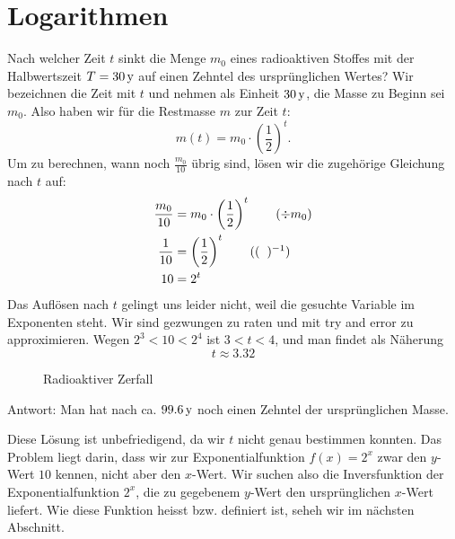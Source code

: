 \documentclass[%
11pt,%
twoside,%
titlepage,%
german,%
headsepline%
]{scrartcl}
\begin{document}
\section{Logarithmen}
\begin{bsp}
Nach welcher Zeit $t$ sinkt die Menge $m_0$ eines radioaktiven Stoffes mit der Halbwertszeit $T=\unit[30]{y}$ auf einen Zehntel des ursprünglichen Wertes? Wir bezeichnen die Zeit mit $t$ und nehmen als Einheit $\unit[30]{y}$, die Masse zu Beginn sei $m_0$. Also haben wir für die Restmasse $m$ zur Zeit $t$:
$$m(t)=m_0\cdot\left(\frac{1}{2}\right)^t.$$
Um zu berechnen, wann noch $\frac{m_0}{10}$ übrig sind, lösen wir die zugehörige Gleichung nach $t$ auf:
    \begin{align*}
    \frac{m_0}{10}&=m_0\cdot\left(\frac{1}{2}\right)^t\tag{$\div m_0$}\\
    \frac{1}{10}&=\left(\frac{1}{2}\right)^t\tag{$(\phantom{x})^{-1}$}\\
    10&=2^t
    \end{align*}
    Das Auflösen nach $t$ gelingt uns leider nicht, weil die gesuchte Variable
    im Exponenten steht. Wir sind gezwungen zu raten und mit try and error zu approximieren. Wegen
    $2^3<10<2^4$ ist $3<t<4$, und man findet als Näherung
    $$t\approx3.32$$    
\begin{figure}
\begin{center}
\end{center}
\caption{Radioaktiver Zerfall}\label{zerfall}
\end{figure}
   Antwort: Man hat nach ca. $\unit[99.6]{y}$
    noch einen Zehntel der ursprünglichen Masse.
    \end{bsp}
  Diese Lösung ist unbefriedigend, da wir $t$ nicht genau bestimmen
  konnten. Das Problem liegt darin, dass wir zur Exponentialfunktion $f(x)=2^x$ zwar den $y$-Wert $10$ kennen, nicht aber den $x$-Wert. Wir suchen also die Inversfunktion der Exponentialfunktion $2^x$, die zu gegebenem $y$-Wert den ursprünglichen $x$-Wert liefert. Wie diese Funktion heisst bzw. definiert ist, seheh wir im nächsten Abschnitt.
  
\end{document}
